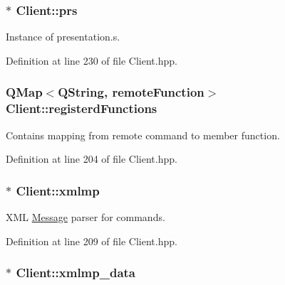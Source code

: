 \subsubsection[{prs}]{$\ast$ Client\+::prs\hspace{0.3cm}{\ttfamily [protected]}}\label{class_client_aae53be4d7e026f6de9416c85bf077384}


Instance of presentation.\+s. 



Definition at line 230 of file Client.\+hpp.

\hypertarget{class_client_a2e033a4a4015c20b2c0d4c8dccd46e7a}{}
\subsubsection[{registerd\+Functions}]{\setlength{\rightskip}{0pt plus 5cm}Q\+Map$<$Q\+String, {\bf remote\+Function}$>$ Client\+::registerd\+Functions\hspace{0.3cm}{\ttfamily [protected]}}\label{class_client_a2e033a4a4015c20b2c0d4c8dccd46e7a}


Contains mapping from remote command to member function. 



Definition at line 204 of file Client.\+hpp.

\hypertarget{class_client_a2ecd2185614d6b5ac3b4409d304fccd6}{}
\subsubsection[{xmlmp}]{$\ast$ Client\+::xmlmp\hspace{0.3cm}{\ttfamily [protected]}}\label{class_client_a2ecd2185614d6b5ac3b4409d304fccd6}


X\+M\+L \hyperlink{class_message}{Message} parser for commands. 



Definition at line 209 of file Client.\+hpp.

\hypertarget{class_client_a24df7928ad0d6e42ab864b10ecbc20e9}{}
\subsubsection[{xmlmp\+\_\+data}]{$\ast$ Client\+::xmlmp\+\_\+data\hspace{0.3cm}{\ttfamily [protected]}}\label{class_client_a24df7928ad0d6e42ab864b10ecbc20e9}


